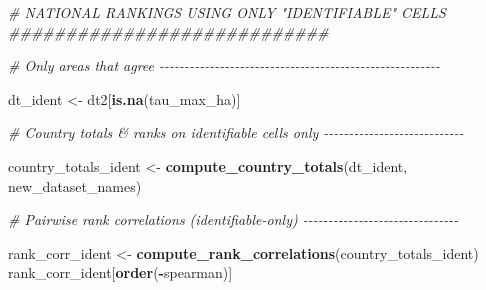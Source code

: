 \documentclass[
  11pt,
]{article}
\newenvironment{Shaded}{\begin{snugshade}}{\end{snugshade}}
\newcommand{\CommentTok}[1]{\textcolor[rgb]{0.56,0.35,0.01}{\textit{#1}}}
\newcommand{\FunctionTok}[1]{\textcolor[rgb]{0.13,0.29,0.53}{\textbf{#1}}}
\newcommand{\NormalTok}[1]{#1}
\newcommand{\OtherTok}[1]{\textcolor[rgb]{0.56,0.35,0.01}{#1}}
\newcommand{\SpecialCharTok}[1]{\textcolor[rgb]{0.81,0.36,0.00}{\textbf{#1}}}
\begin{document}
\begin{Shaded}
\begin{Highlighting}[]
\CommentTok{\# NATIONAL RANKINGS USING ONLY "IDENTIFIABLE" CELLS \#\#\#\#\#\#\#\#\#\#\#\#\#\#\#\#\#\#\#\#\#\#\#\#\#\#\#\#}

\CommentTok{\# Only areas that agree {-}{-}{-}{-}{-}{-}{-}{-}{-}{-}{-}{-}{-}{-}{-}{-}{-}{-}{-}{-}{-}{-}{-}{-}{-}{-}{-}{-}{-}{-}{-}{-}{-}{-}{-}{-}{-}{-}{-}{-}{-}{-}{-}{-}{-}{-}{-}{-}{-}{-}{-}{-}{-}{-}{-}{-}}

\NormalTok{dt\_ident }\OtherTok{\textless{}{-}}\NormalTok{ dt2[}\FunctionTok{is.na}\NormalTok{(tau\_max\_ha)]}

\CommentTok{\# Country totals \& ranks on identifiable cells only {-}{-}{-}{-}{-}{-}{-}{-}{-}{-}{-}{-}{-}{-}{-}{-}{-}{-}{-}{-}{-}{-}{-}{-}{-}{-}{-}{-}}

\NormalTok{country\_totals\_ident }\OtherTok{\textless{}{-}} \FunctionTok{compute\_country\_totals}\NormalTok{(dt\_ident, new\_dataset\_names)}

\CommentTok{\# Pairwise rank correlations (identifiable{-}only) {-}{-}{-}{-}{-}{-}{-}{-}{-}{-}{-}{-}{-}{-}{-}{-}{-}{-}{-}{-}{-}{-}{-}{-}{-}{-}{-}{-}{-}{-}{-}}

\NormalTok{rank\_corr\_ident }\OtherTok{\textless{}{-}} \FunctionTok{compute\_rank\_correlations}\NormalTok{(country\_totals\_ident)}
\NormalTok{rank\_corr\_ident[}\FunctionTok{order}\NormalTok{(}\SpecialCharTok{{-}}\NormalTok{spearman)]}
\end{Highlighting}
\end{Shaded}
\end{document}
